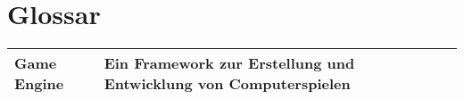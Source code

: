 \section*{Glossar}

\begin{tabularx}{0.8\textwidth} { 
    | >{\raggedright\arraybackslash}X 
    | >{\centering\arraybackslash}X 
    | >{\raggedleft\arraybackslash}X | }
   \hline
   Game Engine & Ein Framework zur Erstellung und Entwicklung von Computerspielen \\
   \hline
  \hline
  \end{tabularx}
